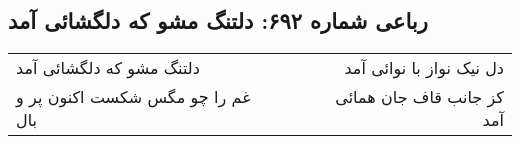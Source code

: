 \begin{center}
\section*{رباعی شماره ۶۹۲: دلتنگ مشو که دلگشائی آمد}
\label{sec:0692}
\begin{longtable}{l p{0.5cm} r}
دلتنگ مشو که دلگشائی آمد
&&
دل نیک نواز با نوائی آمد
\\
غم را چو مگس شکست اکنون پر و بال
&&
کز جانب قاف جان همائی آمد
\\
\end{longtable}
\end{center}

